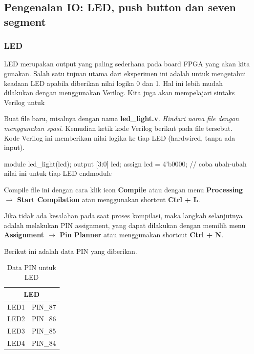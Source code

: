 \subsection{Pengenalan IO: LED, push button dan seven segment}

\subsubsection{LED}

LED merupakan output yang paling sederhana pada board FPGA yang akan
kita gunakan. Salah satu tujuan utama dari eksperimen ini adalah
untuk mengetahui keadaan LED apabila diberikan nilai logika 0 dan 1.
Hal ini lebih mudah dilakukan dengan menggunakan Verilog.
Kita juga akan mempelajari sintaks Verilog untuk


Buat file baru, misalnya dengan nama \textbf{led\_light.v}.
\textit{Hindari nama file dengan menggunakan spasi}.
Kemudian ketik kode Verilog berikut pada file tersebut.
Kode Verilog ini memberikan nilai logika ke tiap
LED (hardwired, tanpa ada input).

{
\begin{verilogcode}
module led_light(led);
  output [3:0] led;
  assign led = 4'b0000; // coba ubah-ubah nilai ini untuk tiap LED
endmodule
\end{verilogcode}
}

Compile file ini dengan cara klik icon \textbf{Compile} atau dengan menu
\textbf{Processing $\rightarrow$ Start Compilation} atau menggunakan shortcut
\textbf{Ctrl + L}.

Jika tidak ada kesalahan pada saat proses kompilasi,
maka langkah selanjutnya adalah melakukan
PIN assignment, yang dapat dilakukan dengan memilih menu
\textbf{Assignment $\rightarrow$ Pin Planner} atau menggunakan shortcut
\textbf{Ctrl + N}.

Berikut ini adalah data PIN yang diberikan.

\begin{table}[H]
\caption{Data PIN untuk LED}\label{tab:pin}
\centering
\begin{tabular}{|c|c|}
\hline 
\multicolumn{2}{|c|}{LED} \\
\hline 
LED1 & PIN\_87 \\
\hline 
LED2 & PIN\_86 \\
\hline 
LED3 & PIN\_85 \\
\hline 
LED4 & PIN\_84 \\
\hline 
\end{tabular}
\par
\end{table}

